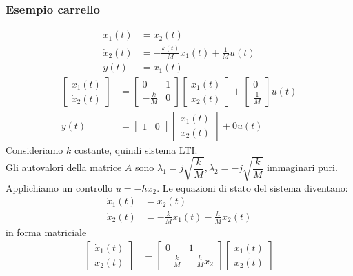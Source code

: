 \documentclass{article}
\begin{document}
\subsubsection{Esempio carrello}
\begin{align*}
    \dot x_1(t) &= x_2(t) \\
    \dot x_2(t) &= - \frac{k(t)}{M}x_1(t) + \frac{1}{M} u(t) \\
    y(t) &= x_1(t)
\end{align*}
\begin{align*}
    \begin{bmatrix}
        \dot x_1(t)\\
        \dot x_2(t)
    \end{bmatrix} &=
    \begin{bmatrix}
        0 & 1\\
        - \frac{k}{M} & 0
    \end{bmatrix}
    \begin{bmatrix}
        x_1(t)\\
        x_2(t)
    \end{bmatrix}
    +
    \begin{bmatrix}
        0\\
        \frac{1}{M}
    \end{bmatrix} u(t)
    \\
    y(t) &= \begin{bmatrix}
        1 & 0
    \end{bmatrix}
    \begin{bmatrix}
        x_1(t)\\
        x_2(t)
    \end{bmatrix} + 0 u(t)
\end{align*}
Consideriamo $k$ costante, quindi sistema LTI.\\
Gli autovalori della matrice $A$ sono $\lambda_1 = j \sqrt{\dfrac{k}{M}}, \lambda_2 = -j \sqrt{\dfrac{k}{M}}$ immaginari puri.
\vspace*{0.2cm}\\
Applichiamo un controllo $u = - hx_2$. Le equazioni di stato del sistema diventano:
\begin{align*}
    \dot x_1(t) &= x_2(t)\\
    \dot x_2(t) &= -\frac{k}{M}x_1(t) - \frac{h}{M}x_2(t)    
\end{align*}
in forma matriciale
\begin{align*}
    \begin{bmatrix}
        \dot x_1(t)\\
        \dot x_2(t)
    \end{bmatrix} &=
    \begin{bmatrix}
        0 & 1\\
        - \frac{k}{M} & -\frac{h}{M}x_2
    \end{bmatrix}
    \begin{bmatrix}
        x_1(t)\\
        x_2(t)
    \end{bmatrix}
\end{align*}
\end{document}
